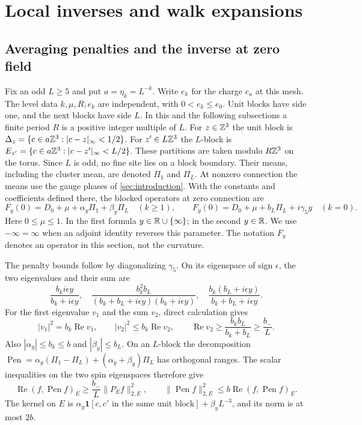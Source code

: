 \section{Local inverses and walk expansions}\label{sec:local-walks}

\subsection{Averaging penalties and the inverse at zero field}
\label{subsec:blocked-zero-inverse}

Fix an odd $L\ge5$ and put $a=\eta_k=L^{-k}$. Write $e_k$ for the
charge $e_a$ at this mesh. The level data $k,\mu,R,e_k$ are independent,
with $0<e_k\le e_0$.
Unit blocks have side
one, and the next blocks have side $L$. In this and the following
subsections a finite period $R$ is a positive integer multiple of $L$.
For $z\in\mathbb Z^3$ the unit block is
$\Delta_z=\{c\in a\mathbb Z^3:|c-z|_\infty<1/2\}$.
For $z'\in L\mathbb Z^3$ the $L$-block is
$E_{z'}=\{c\in a\mathbb Z^3:|c-z'|_\infty<L/2\}$.
These partitions are taken modulo $R\mathbb Z^3$ on the torus. Since $L$
is odd, no fine site lies on a block boundary. Their means, including
the cluster mean, are denoted $\Pi_1$ and $\Pi_L$. At nonzero connection
the means use the gauge phases of \cref{sec:introduction}.
With the constants and coefficients defined there, the blocked operators
at zero connection are
\begin{equation}\label{eq:blocked-zero-operator}
 F_y(0)=D_0+\mu+\alpha_y\Pi_1+\beta_y\Pi_L\quad(k\ge1),
 \qquad
 F_y(0)=D_0+\mu+b_L\Pi_L+i\gamma_5y\quad(k=0).
\end{equation}
Here $0\le\mu\le1$. In the first formula $y\in\mathbb R\cup\{\infty\}$;
in the second $y\in\mathbb R$. We use $-\infty=\infty$ when an adjoint
identity reverses this parameter. The notation $F_y$ denotes an operator in this
section, not the curvature.

The penalty bounds follow by diagonalizing $\gamma_5$. On its eigenspace
of sign $\epsilon$, the two eigenvalues and their sum are
\[
 \frac{b_ki\epsilon y}{b_k+i\epsilon y},\quad
 \frac{b_k^2b_L}{(b_k+b_L+i\epsilon y)(b_k+i\epsilon y)},\quad
 \frac{b_k(b_L+i\epsilon y)}{b_k+b_L+i\epsilon y}.
\]
For the first eigenvalue $v_1$ and the sum $v_2$, direct calculation gives
\[
 |v_1|^2=b_k\operatorname{Re}v_1,\qquad
 |v_2|^2\le b_k\operatorname{Re}v_2,\qquad
 \operatorname{Re}v_2\ge\frac{b_kb_L}{b_k+b_L}\ge\frac{b_-}{L}.
\]
Also $|\alpha_y|\le b_k\le b$ and $|\beta_y|\le b_L$.
On an $L$-block the decomposition
$\operatorname{Pen}=\alpha_y(\Pi_1-\Pi_L)+(\alpha_y+\beta_y)\Pi_L$
has orthogonal ranges. The scalar inequalities on the two spin
eigenspaces therefore give
\begin{equation}\label{eq:penalty-estimates}
 \operatorname{Re}(f,\operatorname{Pen}f)_E
      \ge\frac{b_-}{L}\|P_Ef\|_{2,E}^2,
 \qquad
 \|\operatorname{Pen}f\|_{2,E}^2
      \le b\operatorname{Re}(f,\operatorname{Pen}f)_E.
\end{equation}
The kernel on $E$ is
$\alpha_y\mathbf1[c,c'\text{ in the same unit block}]+\beta_yL^{-3}$,
and its norm is at most $2b$.

